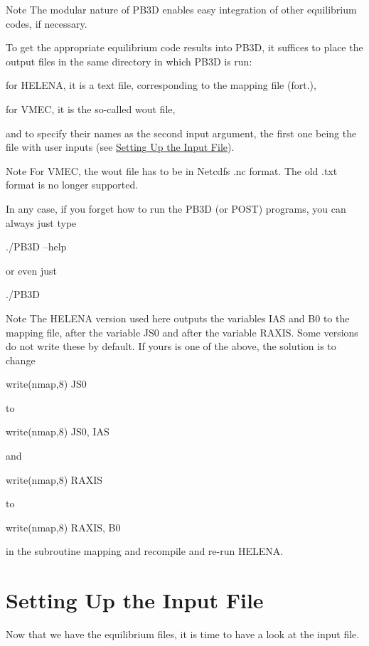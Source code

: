 \begin{DoxyNote}{Note}
The modular nature of P\+B3D enables easy integration of other equilibrium codes, if necessary.
\end{DoxyNote}
To get the appropriate equilibrium code results into P\+B3D, it suffices to place the output files in the same directory in which P\+B3D is run\+:
\begin{DoxyItemize}
\item for H\+E\+L\+E\+NA, it is a text file, corresponding to the mapping file ({\ttfamily fort.}),
\item for V\+M\+EC, it is the so-\/called {\ttfamily wout} file,
\end{DoxyItemize}

and to specify their names as the second input argument, the first one being the file with user inputs (see \hyperlink{page_tutorial_tutorial_inputs}{Setting Up the Input File}).

\begin{DoxyNote}{Note}
For V\+M\+EC, the {\ttfamily wout} file has to be in Netcdf\textquotesingle{}s {\ttfamily .nc} format. The old {\ttfamily .txt} format is no longer supported.
\end{DoxyNote}
In any case, if you forget how to run the P\+B3D (or P\+O\+ST) programs, you can always just type 
\begin{DoxyCode}
./PB3D --help 
\end{DoxyCode}
 or even just 
\begin{DoxyCode}
./PB3D 
\end{DoxyCode}


\begin{DoxyNote}{Note}
The H\+E\+L\+E\+NA version used here outputs the variables {\ttfamily I\+AS} and {\ttfamily B0} to the mapping file, after the variable {\ttfamily J\+S0} and after the variable {\ttfamily R\+A\+X\+IS}. Some versions do not write these by default. If yours is one of the above, the solution is to change 
\begin{DoxyCode}
write(nmap,8) JS0 
\end{DoxyCode}
 to 
\begin{DoxyCode}
write(nmap,8) JS0, IAS 
\end{DoxyCode}
 and 
\begin{DoxyCode}
write(nmap,8) RAXIS 
\end{DoxyCode}
 to 
\begin{DoxyCode}
write(nmap,8) RAXIS, B0 
\end{DoxyCode}
 in the subroutine {\ttfamily mapping} and recompile and re-\/run H\+E\+L\+E\+NA.
\end{DoxyNote}
\hypertarget{page_tutorial_tutorial_inputs}{}\section{Setting Up the Input File}\label{page_tutorial_tutorial_inputs}
Now that we have the equilibrium files, it is time to have a look at the input file.


